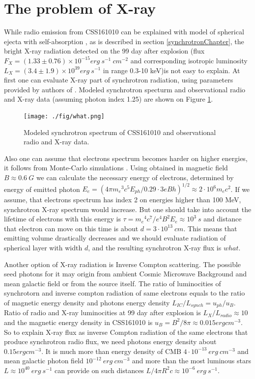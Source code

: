 \documentclass{article}
\begin{document}
	\section{The problem of X-ray}
	While radio emission from CSS161010 can be explained with model of spherical ejecta with self-absorption \cite{Coppejans2020}, as is described in section \ref{synchrotronChapter}, the bright X-ray radiation detected on the 99 day after explosion (flux $F_{X} = (1.33 \pm 0.76)\times10^{-15} erg~s^{-1}~cm^{-2}$ and corresponding isotropic luminosity $L_{X}=(3.4\pm1.9)\times10^{39} erg~s^{-1}$ in range 0.3-10 keV)is not easy to explain.
	At first one can evaluate X-ray part of synchrotron radiation, using parameters provided by authors of \cite{Coppejans2020}. Modeled synchrotron specturm and observational radio and X-ray data (assuming photon index 1.25) are shown on Figure \ref{synchrotronX}. 
	\begin{figure}
		\centering
		\texttt{[image: ./fig/what.png]} 
		\caption{Modeled synchrotron spectrum of CSS161010 and observational radio and X-ray data.}
		\label{synchrotronX}
	\end{figure}
	Also one can assume that electrons spectrum becomes harder on higher energies, it follows from Monte-Carlo simulations \cite{BykovRomansky}. Using obtained in \cite{Coppejans2020} magnetic field $B \approx 0.6~G$ we can calculate the necessary energy of electrons, determined by energy of emitted photon $E_e = (4\pi{m_e}^3 c^5 E_{ph}/0.29\cdot3 e B h)^{1/2} \approx 2\cdot10^6 m_e c^2$. If we assume, that electrons spectrum has index 2 on energies higher than 100 MeV, synchrotron X-ray spectrum would increase. But one should take into account the lifetime of electrons with this energy is $\tau = {m_e}^4 c^7 / e^4 B^2 E_e \approx 10^3~s$ and distance that electron can move on this time is about $d = 3\cdot10^{13}~cm$. This means that emitting volume drastically decreases and we should evaluate radiation of spherical layer with width $d$, and the resulting synchrotron X-ray flux is $what$.
	
	Another option of X-ray radiation is Inverse Compton scattering. The possible seed photons for it may origin from ambient Cosmic Microwave Background and mean galactic field or from the source itself. The ratio of luminocities of synchrotorn and inverse compton radiation of same electrons equals to the ratio of magnetic energy density and photons energy density $L_{IC}/L_{synch}=u_{ph}/u_{B}$. Ratio of radio and X-ray luminocities at 99 day after explosion is $L_{X}/L_{radio} \approx 10$ and the magnetic energy density in CSS161010 is $u_{B}=B^2/8\pi \approx 0.015 erg cm^{-3}$. So to explain X-ray flux as inverse Compton radiation of the same electrons that produce synchrotron radio flux, we need photons energy density about $0.15 erg cm^{-3}$. It is much more than energy density of CMB $4\cdot10^{-13}~erg~cm^{-3}$ and mean galactic photon field $10^{-12}~erg~cm^{-3}$ \cite{Mathis1983} and more than the most luminous stars $L \approx 10^{40}~erg~s^{-1}$ can provide on such distances $L/4\pi R^2 c \approx 10^{-6}~erg~s^{-1}$.
	
\end{document}
